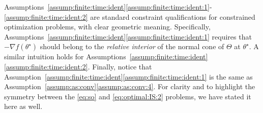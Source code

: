 \documentclass[11pt,a4paper]{article}
\theoremstyle{definition}
\begin{document}
Assumptions~\ref{assump:finite:time:ident}\ref{assump:finite:time:ident:1}-\ref{assump:finite:time:ident:2} are standard constraint qualifications for constrained optimization problems, with clear geometric meaning. Specifically, Assumptions~\ref{assump:finite:time:ident}\ref{assump:finite:time:ident:1} requires that $-\nabla {f}(\theta^\star)$ should belong to the \emph{relative interior} of the normal cone of $\Theta$ at $\theta^\star$. A similar intuition holds for Assumptions~\ref{assump:finite:time:ident}\ref{assump:finite:time:ident:2}. Finally, notice that Assumption~\ref{assump:finite:time:ident}\ref{assump:finite:time:ident:1} is the same as Assumption~\ref{assump:as:conv}\ref{assump:as:conv:4}. For clarity and to highlight the symmetry between the \eqref{eq:so} and \eqref{eq:optimal:IS:2} problems, we have stated it here as well. 
\end{document}
